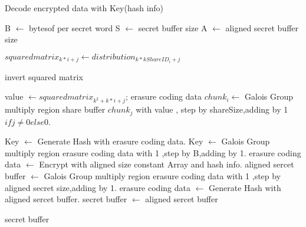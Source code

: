 \documentclass{article}
\begin{document}
\begin{algorithm}[htb]
    \caption{Decode encrypted data with Key(hash info)}
  \begin{algorithmic}[1]

	\STATE B $\gets$ bytesof per secret word
	\STATE S $\gets$ secret buffer size
	\STATE A $\gets$ aligned secret buffer size


        \STATE $squared matrix_{k*i+j} \gets distribution_{k*kShareID_{i}+j}$
      \ENDFOR
    \ENDFOR

	\STATE invert squared matrix

        \STATE value $\gets squared matrix_{k^2+k*i+j}$;
        \STATE erasure coding data $chunk_i \gets$ Galois Group multiply region  share buffer $chunk_j$ with value ,
        step by shareSize,adding by 1 $if j \neq 0 else 0$.
      \ENDFOR
	\ENDFOR

	\STATE Key $\gets$ Generate Hash with erasure coding data.
	\STATE Key $\gets$ Galois Group multiply region  erasure coding data with 1 ,step by B,adding by 1.
	\STATE erasure coding data $\gets$ Encrypt with aligned size constant Array and hash info.
	\STATE aligned sercet buffer $\gets$ Galois Group multiply region  erasure coding data with 1 ,step by aligned secret size,adding by 1.
	\STATE erasure coding data $\gets$ Generate Hash with aligned sercet buffer.
	\STATE secret buffer $\gets$ aligned sercet buffer

	\RETURN secret buffer

  \end{algorithmic}
\end{algorithm}
\end{document}
